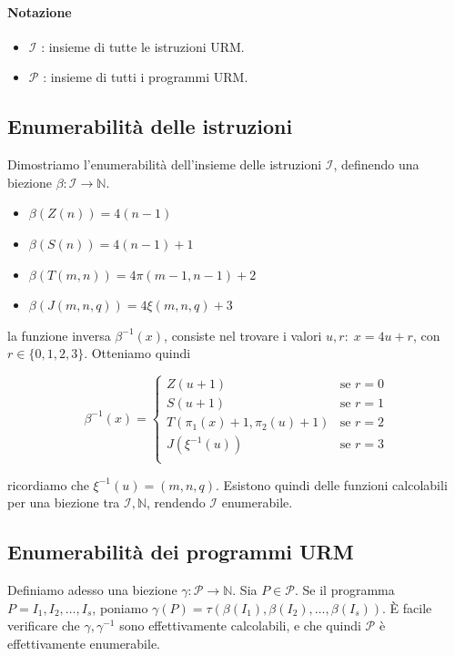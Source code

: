 	\paragraph{Notazione}
	\begin{itemize}
		\item $\mathcal I$ : insieme di tutte le istruzioni URM.
		\item $\mathcal P$ : insieme di tutti i programmi URM.
	\end{itemize}
	
	\subsection{Enumerabilità delle istruzioni}
	Dimostriamo l'enumerabilità dell'insieme delle istruzioni $\mathcal I$, definendo una biezione $\beta: \mathcal I \to \mathbb{N}$.
	
	\begin{itemize}
		\item $\beta (Z(n)) = 4(n-1)$
		\item $\beta (S(n)) = 4(n-1) + 1$
		\item $\beta (T(m, n)) = 4\pi(m-1, n-1) + 2$
		\item $\beta (J(m, n, q)) = 4\xi(m, n, q) + 3$
	\end{itemize}
	
	la funzione inversa $\beta^{-1}(x)$, consiste nel trovare i valori $u, r : \; x = 4u + r$, con $r \in \{0,1,2,3\}$. Otteniamo quindi
	
	$$
	\beta^{-1}(x) = \begin{cases}
	Z(u+1) & \text{se } r = 0\\
	S(u+1) & \text{se } r = 1\\
	T(\pi_1(x) + 1, \pi_2(u) + 1) & \text{se } r = 2\\
	J( \xi^{-1}(u)) & \text{se } r = 3\\
	\end{cases}
	$$
	
	ricordiamo che $\xi^{-1}(u) = (m,n,q)$. Esistono quindi delle funzioni calcolabili per una biezione tra $\mathcal I, \mathbb N$, rendendo $\mathcal I$ enumerabile.
	
	\subsection{Enumerabilità dei programmi URM}
	Definiamo adesso una biezione $\gamma : \mathcal{P} \to \mathbb{N}$. Sia $P \in \mathcal P$. Se il programma $P = I_1,I_2,\dots,I_s$, poniamo $\gamma(P) = \tau (\beta(I_1), \beta(I_2), \dots, \beta(I_s))$. È facile verificare che $\gamma, \gamma^{-1}$ sono effettivamente calcolabili, e che quindi $\mathcal P$ è effettivamente enumerabile.
	
